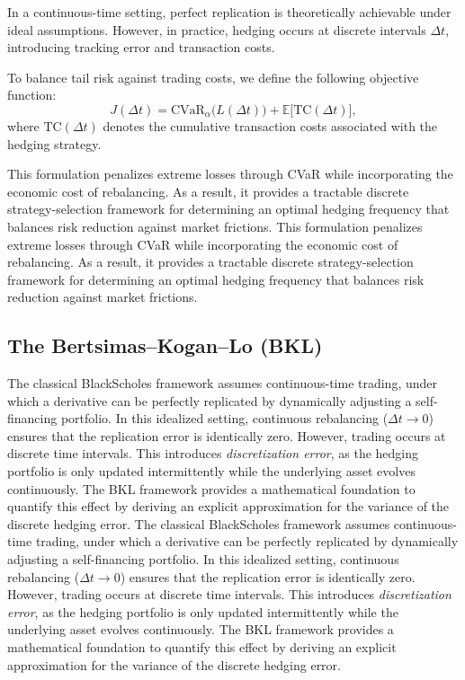 \documentclass{article}
\begin{document}


In a continuous-time setting, perfect replication is theoretically achievable under ideal assumptions. However, in practice, hedging occurs at discrete intervals $\Delta t$, introducing tracking error and transaction costs.

To balance tail risk against trading costs, we define the following objective function:
\[
J(\Delta t) = \text{CVaR}_\alpha\big(L(\Delta t)\big)
+ \mathbb{E}\big[\text{TC}(\Delta t)\big],
\]
where $\text{TC}(\Delta t)$ denotes the cumulative transaction costs associated with the hedging strategy.

This formulation penalizes extreme losses through CVaR while incorporating the economic cost of rebalancing. As a result, it provides a tractable discrete strategy-selection framework for determining an optimal hedging frequency that balances risk reduction against market frictions.
This formulation penalizes extreme losses through CVaR while incorporating the economic cost of rebalancing. As a result, it provides a tractable discrete strategy-selection framework for determining an optimal hedging frequency that balances risk reduction against market frictions.

\subsection{The Bertsimas--Kogan--Lo (BKL) }
The classical BlackScholes framework assumes continuous-time trading, under which a derivative can be perfectly replicated by dynamically adjusting a self-financing portfolio. In this idealized setting, continuous rebalancing ($\Delta t \to 0$) ensures that the replication error is identically zero. However, trading occurs at discrete time intervals. This introduces \emph{discretization error}, as the hedging portfolio is only updated intermittently while the underlying asset evolves continuously. The BKL framework provides a mathematical foundation to quantify this effect by deriving an explicit approximation for the variance of the discrete hedging error.
The classical BlackScholes framework assumes continuous-time trading, under which a derivative can be perfectly replicated by dynamically adjusting a self-financing portfolio. In this idealized setting, continuous rebalancing ($\Delta t \to 0$) ensures that the replication error is identically zero. However, trading occurs at discrete time intervals. This introduces \emph{discretization error}, as the hedging portfolio is only updated intermittently while the underlying asset evolves continuously. The BKL framework provides a mathematical foundation to quantify this effect by deriving an explicit approximation for the variance of the discrete hedging error.
\end{document}
